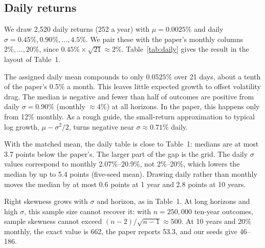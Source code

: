 \documentclass[11pt,letterpaper]{article}
\newcommand{\tablefont}{\footnotesize\setlength{\tabcolsep}{3.4pt}}
\begin{document}
\subsection{Daily returns}

We draw 2,520 daily returns (252 a year) with $\mu = 0.0025\%$ and daily $\sigma = 0.45\%, 0.90\%, \dots, 4.5\%$.
We pair these with the paper's monthly columns $2\%, \dots, 20\%$, since $0.45\% \times \sqrt{21} \approx 2\%$.
Table~\ref{tab:daily} gives the result in the layout of Table~1.

\begin{table}[!htbp]
  \centering\tablefont
  \caption{Table~1 with \textbf{daily} normal returns, $\mu = 0.0025\%$ a day (seed 0, 250,000 paths).}
  \label{tab:daily}
  
\end{table}

\begin{table}[!htbp]
  \centering\tablefont
  \caption{Comparison with Table~1 at the 10-year horizon. ``Matched $\mu$'' is $1.005^{1/21} - 1 = 0.0238\%$ a
    day, i.e.\ the paper's 0.5\% a month.}
  \label{tab:compare}
  
\end{table}

The assigned daily mean compounds to only $0.0525\%$ over 21 days, about a tenth of
    the paper's 0.5\% a month. This leaves little expected growth to offset volatility drag. The median is negative and fewer than half of
    outcomes are positive from daily $\sigma = 0.90\%$ (monthly $\approx 4\%$) at all horizons. In the paper, this
    happens only from 12\% monthly. As a rough guide, the small-return approximation to typical log growth,
    $\mu - \sigma^2/2$, turns negative near $\sigma \approx 0.71\%$ daily.

With the matched mean, the daily table is close
    to Table~1: medians are at most 3.7 points below the paper's. The larger part of the gap is the grid. The daily
    $\sigma$ values correspond to monthly 2.07\%--20.9\%, not 2\%--20\%, which lowers the median by up to 5.4 points
    (five-seed mean). Drawing daily rather than monthly moves the median by at most 0.6 points at 1 year and 2.8
    points at 10 years.

Right skewness grows with $\sigma$ and horizon, as in Table~1. At long horizons and high
    $\sigma$, this sample size cannot recover it: with $n = 250{,}000$ ten-year outcomes, sample skewness cannot
    exceed $(n-2)/\sqrt{n-1} \approx 500$. At 10 years and 20\% monthly, the exact value is 662, the paper reports
    53.3, and our seeds give 46--186.
\end{document}
